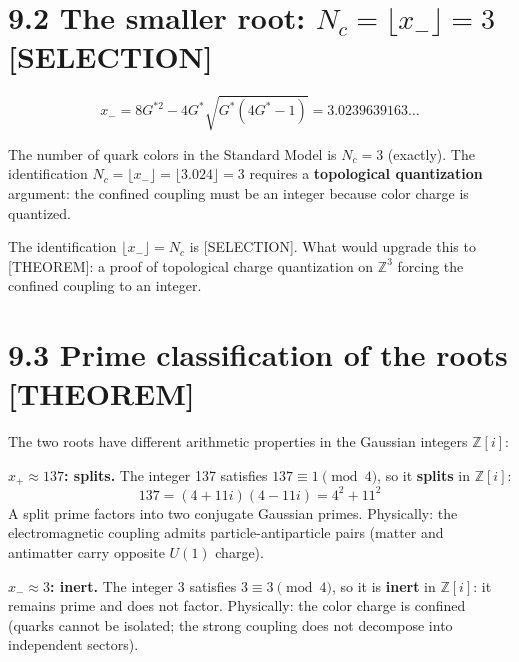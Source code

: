 \documentclass[
  11pt,
  letterpaper,
  twoside,
  openright]{book}
\begin{document}
\section{\texorpdfstring{9.2 The smaller root:
\(N_c = \lfloor x_- \rfloor = 3\)
{[}SELECTION{]}}{9.2 The smaller root: N\_c = \textbackslash lfloor x\_- \textbackslash rfloor = 3 {[}SELECTION{]}}}\label{the-smaller-root-n_c-lfloor-x_--rfloor-3-selection}

\[
x_- = 8G^{*2} - 4G^*\sqrt{G^*(4G^* - 1)} = 3.0239639163\ldots
\]

The number of quark colors in the Standard Model is \(N_c = 3\)
(exactly). The identification
\(N_c = \lfloor x_- \rfloor = \lfloor 3.024 \rfloor = 3\) requires a
\textbf{topological quantization} argument: the confined coupling must
be an integer because color charge is quantized.

\begin{ftdselection}

The identification \(\lfloor x_- \rfloor = N_c\) is {[}SELECTION{]}.
What would upgrade this to {[}THEOREM{]}: a proof of topological charge
quantization on \(\mathbb{Z}^3\) forcing the confined coupling to an
integer.

\end{ftdselection}

\section{9.3 Prime classification of the roots
{[}THEOREM{]}}\label{prime-classification-of-the-roots-theorem}

The two roots have different arithmetic properties in the Gaussian
integers \(\mathbb{Z}[i]\):

\textbf{\(x_+ \approx 137\): splits.} The integer 137 satisfies
\(137 \equiv 1 \pmod{4}\), so it \textbf{splits} in \(\mathbb{Z}[i]\):
\[
137 = (4 + 11i)(4 - 11i) = 4^2 + 11^2
\] A split prime factors into two conjugate Gaussian primes. Physically:
the electromagnetic coupling admits particle-antiparticle pairs (matter
and antimatter carry opposite \(U(1)\) charge).

\textbf{\(x_- \approx 3\): inert.} The integer 3 satisfies
\(3 \equiv 3 \pmod{4}\), so it is \textbf{inert} in \(\mathbb{Z}[i]\):
it remains prime and does not factor. Physically: the color charge is
confined (quarks cannot be isolated; the strong coupling does not
decompose into independent sectors).
\end{document}
